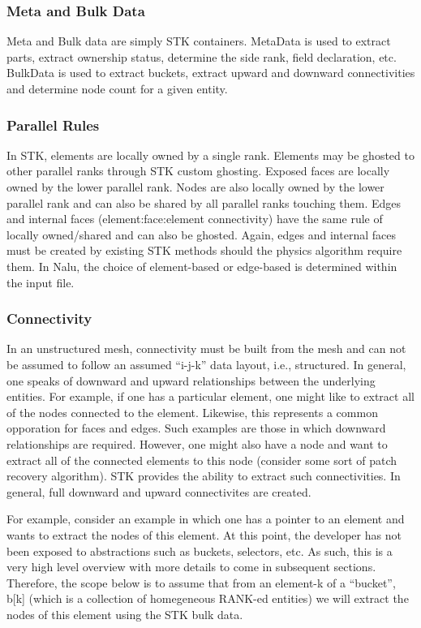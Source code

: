 \subsubsection{Meta and Bulk Data}
Meta and Bulk data are simply STK containers. MetaData is used to extract parts, 
extract ownership status, determine the side rank, field declaration, etc. 
BulkData is used to extract buckets, extract upward and downward connectivities 
and determine node count for a given entity.

\subsubsection{Parallel Rules}
In STK, elements are locally owned by a single rank. Elements may be ghosted to other parallel ranks
through STK custom ghosting. Exposed faces are locally owned by the lower parallel rank. Nodes
are also locally owned by the lower parallel rank and can also be shared by all parallel ranks touching
them. Edges and internal faces (element:face:element connectivity) have the same rule of locally 
owned/shared and can also be ghosted. Again, edges and internal faces must be created by existing
STK methods should the physics algorithm require them. In Nalu, the choice of element-based 
or edge-based is determined within the input file.

\subsubsection{Connectivity}
In an unstructured mesh, connectivity must be built from the mesh and can not be assumed to 
follow an assumed ``i-j-k'' data layout, i.e., structured. In general, one speaks of downward and upward 
relationships between the underlying entities. For example, if one has a particular element, one might
like to extract all of the nodes connected to the element. Likewise, this represents a common opporation
for faces and edges. Such examples are those in which downward relationships are required. 
However, one might also have a node and want to extract all of the connected elements to this 
node (consider some sort of patch recovery algorithm). STK provides the ability to extract 
such connectivities. In general, full downward and upward connectivites are created.

For example, consider an example in which one has a pointer to an element and wants to 
extract the nodes of this element. At this point, the developer has not been exposed to 
abstractions such as buckets, selectors, etc. As such, this is a very high level overview
with more details to come in subsequent sections. Therefore, the scope below is to assume that
from an element-k of a ``bucket'', b[k] (which is a collection of homegeneous RANK-ed entities) 
we will extract the nodes of this element using the STK bulk data.

